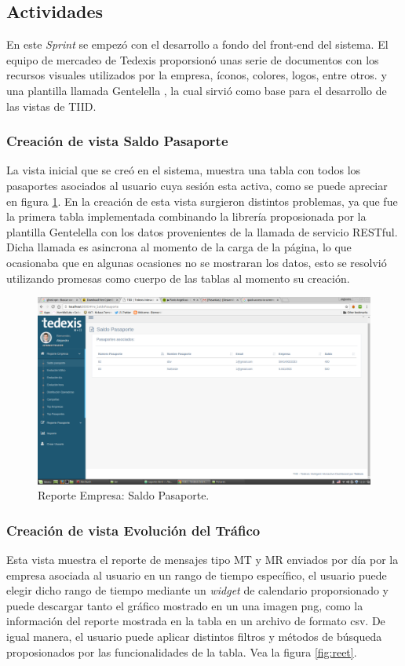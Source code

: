 \subsection{Actividades}
\indent En este \textit{Sprint} se empezó con el desarrollo a fondo del front-end del sistema. El equipo de mercadeo de Tedexis proporsionó unas serie de documentos con los recursos visuales utilizados por la empresa, íconos, colores, logos, entre otros. y una plantilla llamada Gentelella \cite{gentelella}, la cual sirvió como base para el desarrollo de las vistas de TIID.

\subsubsection{Creación de vista Saldo Pasaporte}
\indent La vista inicial que se creó en el sistema, muestra una tabla con todos los pasaportes asociados al usuario cuya sesión esta activa, como se puede apreciar en figura \ref{fig:saldopasaporte}. En la creación de esta vista surgieron distintos problemas, ya que fue la primera tabla implementada combinando la librería proposionada por la plantilla Gentelella con los datos provenientes de la llamada de servicio RESTful. Dicha llamada es asincrona al momento de la carga de la página, lo que ocasionaba que en algunas ocasiones no se mostraran los datos, esto se resolvió utilizando promesas como cuerpo de las tablas al momento su creación.

\begin{figure}[ht]
  \centering
  \includegraphics[scale=0.25,type=png,ext=.png,read=.png]{imagenes/saldopasaporte}
  \caption{Reporte Empresa: Saldo Pasaporte.}
  \label{fig:saldopasaporte}
\end{figure}

\subsubsection{Creación de vista Evolución del Tráfico}
\indent Esta vista muestra el reporte de mensajes tipo MT y MR enviados por día por la empresa asociada al usuario en un rango de tiempo específico, el usuario puede elegir dicho rango de tiempo mediante un \textit{widget} de calendario proporsionado y puede descargar tanto el gráfico mostrado en un una imagen png, como la información del reporte mostrada en la tabla en un archivo de formato csv. De igual manera, el usuario puede aplicar distintos filtros y métodos de búsqueda proposionados por las funcionalidades de la tabla. Vea la figura \ref{fig:reet}.

